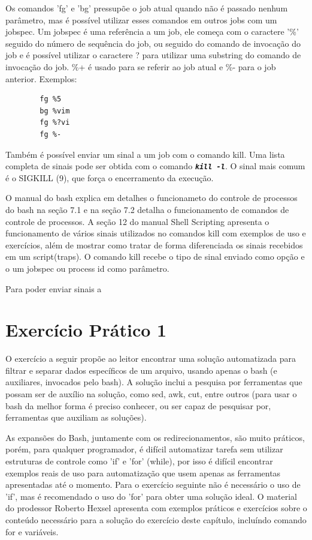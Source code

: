 \documentclass[oneside, 11 pt]{article}
\begin{document}
	 Os comandos 'fg' e 'bg' pressupõe o job atual quando não é passado nenhum parâmetro, mas é possível utilizar esses comandos em outros jobs com um jobspec. Um jobspec é uma referência a um job, ele começa com o caractere '\%' seguido do número de sequência do job, ou seguido do comando de invocação do job e é possível utilizar o caractere ? para utilizar uma substring do comando de invocação do job. \%+ é usado para se referir ao job atual e \%- para o job anterior.
	 Exemplos:
	 \begin{lstlisting}
	 	fg %5
	 	bg %vim
	 	fg %?vi
	 	fg %-
	 \end{lstlisting}
	
	Também é possível enviar um sinal a um job com o comando kill. Uma lista completa de sinais pode ser obtida com o comando \texttt{\textbf{\textit{kill -l}}}. O sinal mais comum é o SIGKILL (9), que força o encerramento da execução. 
	 
	O manual do bash \cite{bashman} explica em detalhes o funcionameto do controle de processos do bash na seção 7.1 e na seção 7.2 detalha o funcionamento de comandos de controle de processos. A seção 12 do manual Shell Scripting \cite{learnl} apresenta o funcionamento de vários sinais utilizados no comandos kill com exemplos de uso e exercícios, além de mostrar como tratar de forma diferenciada os sinais recebidos em um script(traps). O comando kill recebe o tipo de sinal enviado como opção e o um jobspec ou process id como parâmetro.
	
	Para poder enviar sinais a 
	
	
	\newpage
	\part{Exercício Prático 1}
	
	O exercício a seguir propõe ao leitor encontrar uma solução automatizada para filtrar e separar dados específicos de um arquivo, usando apenas o bash (e auxiliares, invocados pelo bash). A solução inclui a pesquisa por ferramentas que possam ser de auxílio na solução, como sed, awk, cut, entre outros (para usar o bash da melhor forma é preciso conhecer, ou ser capaz de pesquisar por, ferramentas que auxiliam as soluções).

	As expansões do Bash, juntamente com os redirecionamentos, são muito práticos, porém, para qualquer programador, é difícil automatizar tarefa sem utilizar estruturas de controle como 'if' e 'for' (while), por isso é difícil encontrar exemplos reais de uso para automatização que usem apenas as ferramentas apresentadas até o momento. Para o exercício seguinte não é necessário o uso de 'if', mas é recomendado o uso do 'for' para obter uma solução ideal. O material do prodessor Roberto Hexsel \cite{roberto3} apresenta com exemplos práticos e exercícios sobre o conteúdo necessário para a solução do exercício deste capítulo, incluíndo comando for e variáveis.
	
\end{document}
